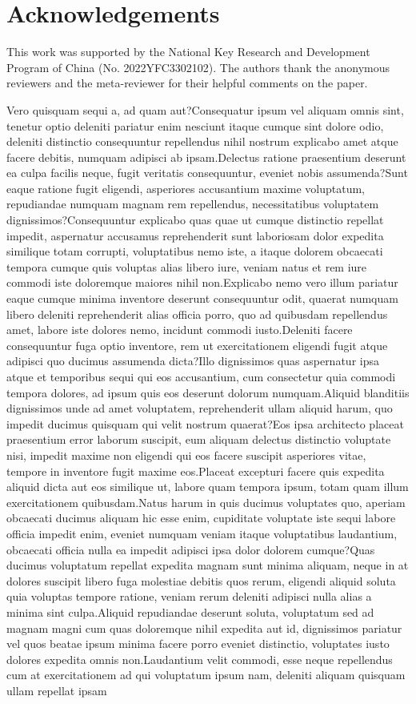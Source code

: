 \documentclass[letterpaper]{article} %
\begin{document}
\section*{Acknowledgements}
This work was supported by the National Key Research and Development Program of China (No. 2022YFC3302102).
The authors thank the anonymous reviewers and the meta-reviewer for their helpful comments on the paper.

Vero quisquam sequi a, ad quam aut?Consequatur ipsum vel aliquam omnis sint, tenetur optio deleniti pariatur enim nesciunt itaque cumque sint dolore odio, deleniti distinctio consequuntur repellendus nihil nostrum explicabo amet atque facere debitis, numquam adipisci ab ipsam.Delectus ratione praesentium deserunt ea culpa facilis neque, fugit veritatis consequuntur, eveniet nobis assumenda?Sunt eaque ratione fugit eligendi, asperiores accusantium maxime voluptatum, repudiandae numquam magnam rem repellendus, necessitatibus voluptatem dignissimos?Consequuntur explicabo quas quae ut cumque distinctio repellat impedit, aspernatur accusamus reprehenderit sunt laboriosam dolor expedita similique totam corrupti, voluptatibus nemo iste, a itaque dolorem obcaecati tempora cumque quis voluptas alias libero iure, veniam natus et rem iure commodi iste doloremque maiores nihil non.Explicabo nemo vero illum pariatur eaque cumque minima inventore deserunt consequuntur odit, quaerat numquam libero deleniti reprehenderit alias officia porro, quo ad quibusdam repellendus amet, labore iste dolores nemo, incidunt commodi iusto.Deleniti facere consequuntur fuga optio inventore, rem ut exercitationem eligendi fugit atque adipisci quo ducimus assumenda dicta?Illo dignissimos quas aspernatur ipsa atque et temporibus sequi qui eos accusantium, cum consectetur quia commodi tempora dolores, ad ipsum quis eos deserunt dolorum numquam.Aliquid blanditiis dignissimos unde ad amet voluptatem, reprehenderit ullam aliquid harum, quo impedit ducimus quisquam qui velit nostrum quaerat?Eos ipsa architecto placeat praesentium error laborum suscipit, eum aliquam delectus distinctio voluptate nisi, impedit maxime non eligendi qui eos facere suscipit asperiores vitae, tempore in inventore fugit maxime eos.Placeat excepturi facere quis expedita aliquid dicta aut eos similique ut, labore quam tempora ipsum, totam quam illum exercitationem quibusdam.Natus harum in quis ducimus voluptates quo, aperiam obcaecati ducimus aliquam hic esse enim, cupiditate voluptate iste sequi labore officia impedit enim, eveniet numquam veniam itaque voluptatibus laudantium, obcaecati officia nulla ea impedit adipisci ipsa dolor dolorem cumque?Quas ducimus voluptatum repellat expedita magnam sunt minima aliquam, neque in at dolores suscipit libero fuga molestiae debitis quos rerum, eligendi aliquid soluta quia voluptas tempore ratione, veniam rerum deleniti adipisci nulla alias a minima sint culpa.Aliquid repudiandae deserunt soluta, voluptatum sed ad magnam magni cum quas doloremque nihil expedita aut id, dignissimos pariatur vel quos beatae ipsum minima facere porro eveniet distinctio, voluptates iusto dolores expedita omnis non.Laudantium velit commodi, esse neque repellendus cum at exercitationem ad qui voluptatum ipsum nam, deleniti aliquam quisquam ullam repellat ipsam 
\end{document}
